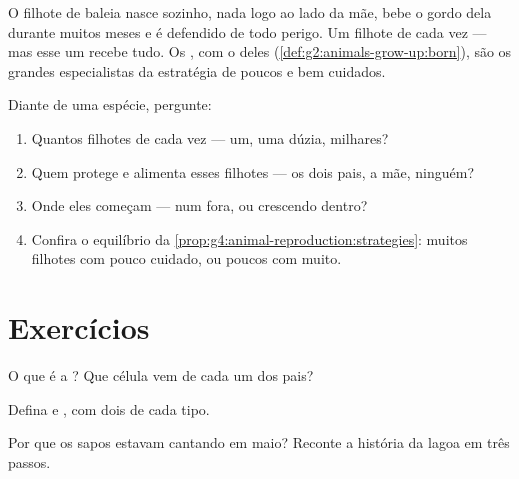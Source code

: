 \begin{example}\label{ex:g4:animal-reproduction:whalecalf}
O filhote de baleia nasce sozinho, nada logo ao lado da mãe, bebe o
 gordo dela durante muitos meses e é defendido de todo perigo.
Um filhote de cada vez --- mas esse um recebe tudo. Os ,
com o  deles (\cref{def:g2:animals-grow-up:born}), são os
grandes especialistas da estratégia de poucos e bem cuidados.
\end{example}

\begin{method}\label{met:g4:animal-reproduction:read}
Diante de uma espécie, pergunte:
\begin{enumerate}
  \item Quantos filhotes de cada vez --- um, uma dúzia, milhares?
  \item Quem protege e alimenta esses filhotes --- os dois pais, a
        mãe, ninguém?
  \item Onde eles começam --- num  fora, ou crescendo dentro?
  \item Confira o equilíbrio da
        \cref{prop:g4:animal-reproduction:strategies}: muitos
        filhotes com pouco cuidado, ou poucos com muito.
\end{enumerate}
\end{method}

\section{Exercícios}

\begin{exercise}[$\star$]\label{exo:g4:animal-reproduction:1}
O que é a ? Que célula vem de cada um dos pais?
\end{exercise}

\begin{exercise}[$\star$]\label{exo:g4:animal-reproduction:2}
Defina  e , com dois  de cada tipo.
\end{exercise}

\begin{exercise}[$\star$]\label{exo:g4:animal-reproduction:3}
Por que os sapos estavam cantando em maio? Reconte a história da
lagoa em três passos.
\end{exercise}

